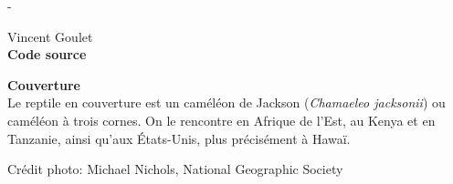 \begingroup
\calccentering{\unitlength}
\begin{adjustwidth*}{\unitlength}{-\unitlength}
  \setlength{\parindent}{0pt}
  \setlength{\parskip}{\baselineskip}
  \small

  {\textcopyright} {\year} Vincent Goulet \\

  

  \textbf{Code source} \\
  \viewsource{\ghurl}

  \textbf{Couverture} \\
  Le reptile en couverture est un caméléon de Jackson (\emph{Chamaeleo
    jacksonii}) ou caméléon à trois cornes. On le rencontre en Afrique
  de l'Est, au Kenya et en Tanzanie, ainsi qu'aux États-Unis, plus
  précisément à Hawaï.

  Crédit photo: Michael Nichols, National Geographic Society
\end{adjustwidth*}
\endgroup

